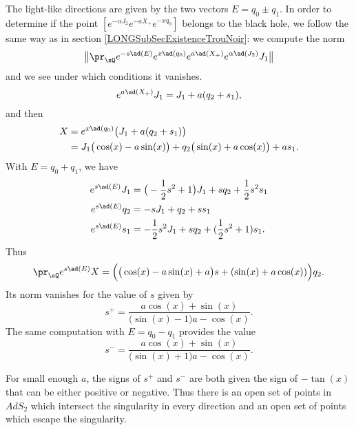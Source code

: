 The light-like directions are given by the two vectors $E=q_0\pm q_1$. In order to determine if the point $[e^{-\alpha J_2}e^{-aX_+} e^{-xq_0}]$ belongs to the black hole, we follow the same way as in section \ref{LONGSubSecExistenceTrouNoir}: we compute the norm
\begin{equation}
	\big\| \pr_{\sQ}  e^{-s\ad(E)}e^{x\ad(q_0)} e^{a\ad(X_+)} e^{\alpha\ad(J_2)}J_1 \big\|
\end{equation}
and we see under which conditions it vanishes. 
%
\begin{equation}
	e^{a\ad(X_+)}J_1=J_1+a(q_2+s_1),
\end{equation}
and then
\begin{equation}
	\begin{aligned}[]
		X&= e^{x\ad(q_0)}\big( J_1+a(q_2+s_1) \big)\\
		&=J_1\big( \cos(x)-a\sin(x) \big)+q_2\big( \sin(x)+a\cos(x) \big)+as_1.
	\end{aligned}
\end{equation}
With $E=q_0+q_1$, we have
\begin{equation}
	\begin{aligned}[]
		e^{s\ad(E)}J_1&=\big( -\frac{ 1 }{2}s^2+1 \big)J_1+sq_2+\frac{ 1 }{2}s^2s_1\\
		e^{s\ad(E)}q_2&=-sJ_1+q_2+ss_1\\
		e^{s\ad(E)}s_1&=-\frac{ 1 }{2}s^2J_1+sq_2+(\frac{ 1 }{2}s^2+1)s_1.
	\end{aligned}
\end{equation}
Thus
\begin{equation}
	\pr_{\sQ} e^{s\ad(E)}X=\Big( \big( \cos(x)-a\sin(x)+a \big)s+(\sin(x)+a\cos(x)) \Big)q_2.
\end{equation}
Its norm vanishes for the value of $s$ given by
\begin{equation}
	s^+=\frac{ a\cos(x)+\sin(x) }{ \big( \sin(x)-1 \big)a-\cos(x) }.
\end{equation}
The same computation with $E=q_0-q_1$ provides the value
\begin{equation}
	s^-=\frac{ a\cos(x)+\sin(x) }{ \big( \sin(x)+1 \big)a-\cos(x) }.
\end{equation}

For small enough $a$, the signs of $s^+$ and $s^-$ are both given the sign of $-\tan(x)$ that can be either positive or negative. Thus there is an open set of points in $AdS_2$ which intersect the singularity in every direction and an open set of points which escape the singularity.

